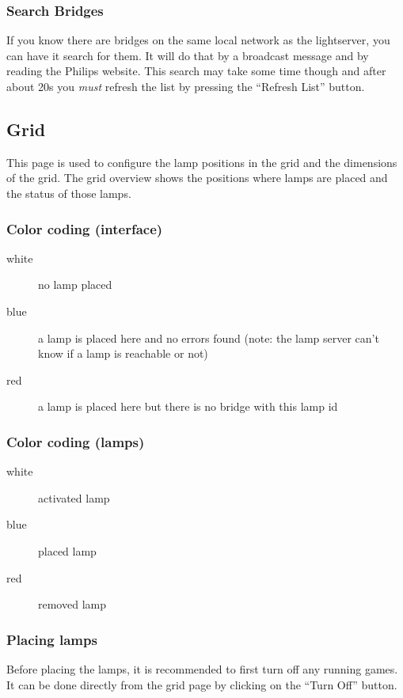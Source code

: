 \subsubsection{Search Bridges}
If you know there are bridges on the same local network as the lightserver,
you can have it search for them. It will do that by a broadcast message and by
reading the Philips website. This search may take some time though and after
about 20s you \textit{must} refresh the list by pressing the ``Refresh List''
button.


\subsection{Grid}

This page is used to configure the lamp positions in the grid and the
dimensions of the grid.  The grid overview shows the positions where lamps are
placed and the status of those lamps.

\subsubsection{Color coding (interface)}
  \begin{description}
    \item[white] no lamp placed
    \item[blue]  a lamp is placed here and no errors found (note: the lamp
                 server can't know if a lamp is reachable or not)
    \item[red]   a lamp is placed here but there is no bridge with this lamp id
  \end{description}

\subsubsection{Color coding (lamps)}
  \begin{description}
    \item[white] activated lamp
    \item[blue]  placed lamp
    \item[red]   removed lamp
  \end{description}

\subsubsection{Placing lamps}
Before placing the lamps, it is recommended to first turn off any running
games. It can be done directly from the grid page by clicking on the ``Turn
Off'' button.

